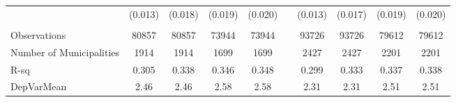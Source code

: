 \begin{tabular}{lccccccccc}
      & (0.013) & (0.018) & (0.019) & (0.020) &       & (0.013) & (0.017) & (0.019) & (0.020) \\
      &       &       &       &       &       &       &       &       &  \\
\midrule
Observations & 80857 & 80857 & 73944 & 73944 &       & 93726 & 93726 & 79612 & 79612 \\
Number of Municipalities & 1914  & 1914  & 1699  & 1699  &       & 2427  & 2427  & 2201  & 2201 \\
R-sq  & 0.305 & 0.338 & 0.346 & 0.348 &       & 0.299 & 0.333 & 0.337 & 0.338 \\
DepVarMean & 2.46  & 2.46  & 2.58  & 2.58  &       & 2.31  & 2.31  & 2.51  & 2.51 \\
\bottomrule
\bottomrule
\end{tabular}%
